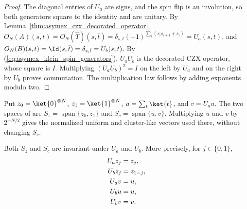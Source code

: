 \begin{proof}
    \leanok
    The diagonal entries of $U_a$ are signs, and the spin flip is an
    involution, so both generators square to the identity and are unitary.
    By Lemma~\ref{thm:asymex_czx_decorated_operator},
    $O_N(A)(s,t)=O_N(\widehat T)(s,\bar t)
        =\delta_{s,t}(-1)^{\sum_i(s_is_{i+1}+s_i)}=U_a(s,t)$, and
    $O_N(B)(s,t)=\Id(s,\bar t)=\delta_{s,\bar t}=U_b(s,t)$. By (\ref{eq:asymex_klein_spin_generators}), $U_aU_b$ is the
    decorated CZX operator, whose square is $I$. Multiplying
    $(U_aU_b)^2=I$ on the left by $U_a$ and on the right by $U_b$ proves
    commutation. The multiplication law follows by adding exponents
    modulo two.
\end{proof}

\begin{definition}
    \label{def:asymex_klein_spin_spaces}
    \leanok
    Put $z_0=\ket{0}^{\otimes N}$, $z_1=\ket{1}^{\otimes N}$,
    $u=\sum_t\ket{t}$, and $v=U_au$. The two spaces of
    \cite[Section~6]{GarreRubio2023MPOSym} are
    $S_z=\operatorname{span}\{z_0,z_1\}$ and
    $S_c=\operatorname{span}\{u,v\}$.
    Multiplying $u$ and $v$ by $2^{-N/2}$ gives the normalized uniform
    and cluster-like vectors used there, without changing $S_c$.
\end{definition}

\begin{lemma}
    \label{thm:asymex_klein_spin_spaces}
    \leanok
    Both $S_z$ and $S_c$ are invariant under $U_a$ and $U_b$. More precisely,
    for $j\in\{0,1\}$,
    \begin{align}
        \label{eq:asymex_klein_spin_actions}
        U_a z_j & =z_j,           \\
        U_b z_j & =z_{1-j},\notag \\
        U_a v   & =u,\notag       \\
        U_b u   & =u,\notag       \\
        U_b v   & =v.\notag
    \end{align}
\end{lemma}

